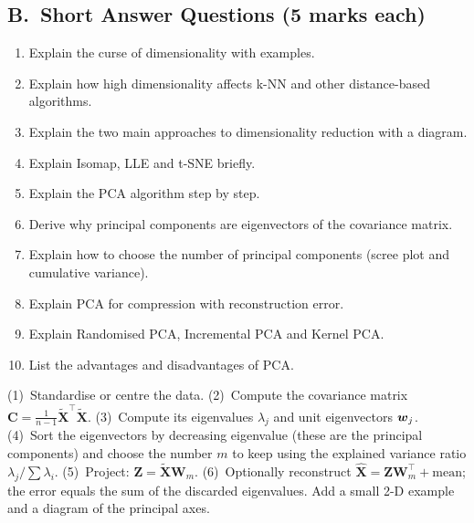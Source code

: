 \subsection*{B.\ Short Answer Questions (5 marks each)}
\begin{enumerate}
  \item Explain the curse of dimensionality with examples. 
  \item Explain how high dimensionality affects k-NN and other distance-based algorithms. 
  \item Explain the two main approaches to dimensionality reduction with a diagram. 
  \item Explain Isomap, LLE and t-SNE briefly. 
  \item Explain the PCA algorithm step by step. 
  \item Derive why principal components are eigenvectors of the covariance matrix. 
  \item Explain how to choose the number of principal components (scree plot and cumulative variance). 
  \item Explain PCA for compression with reconstruction error. 
  \item Explain Randomised PCA, Incremental PCA and Kernel PCA. 
  \item List the advantages and disadvantages of PCA. 
\end{enumerate}

\begin{modelans}
(1)~Standardise or centre the data. (2)~Compute the covariance matrix $\mathbf C=\frac1{n-1}\tilde{\mathbf X}^{\!\top}\tilde{\mathbf X}$. (3)~Compute its eigenvalues $\lambda_j$ and unit eigenvectors $\boldsymbol{w}_j$. (4)~Sort the eigenvectors by decreasing eigenvalue (these are the principal components) and choose the number $m$ to keep using the explained variance ratio $\lambda_j/\sum\lambda_i$. (5)~Project: $\mathbf Z=\tilde{\mathbf X}\mathbf W_m$. (6)~Optionally reconstruct $\hat{\mathbf X}=\mathbf Z\mathbf W_m^{\!\top}+\text{mean}$; the error equals the sum of the discarded eigenvalues. Add a small 2-D example and a diagram of the principal axes.
\end{modelans}

